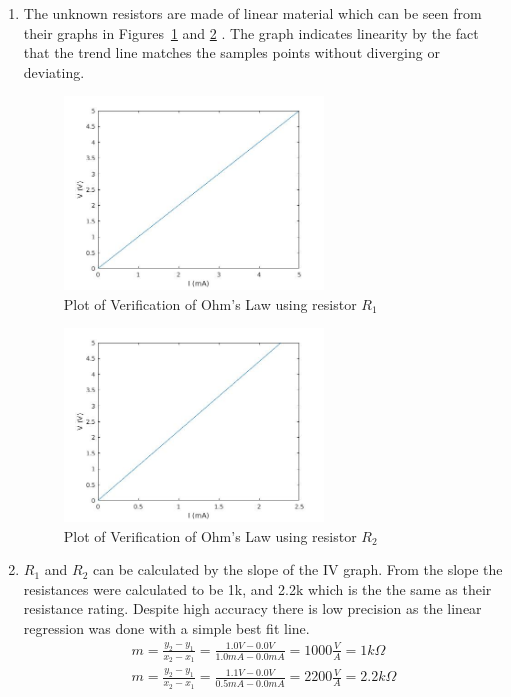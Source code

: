 \documentclass{article}
\begin{document}
\begin{enumerate}
  \item The unknown resistors are made of linear material which can be seen from their graphs in Figures~\ref{fig:plot1} and \ref{fig:plot2} .
  The graph indicates linearity by the fact that the trend line matches the
  samples points without diverging or deviating.
    \begin{figure}[!ht]
  \centering
  \caption{Plot of Verification of Ohm's Law using resistor $R_1$\label{fig:plot1}}
  \includegraphics[width=0.65\textwidth]{img/plot1.jpg}
  \end{figure}

    \begin{figure}[!ht]
  \centering
  \caption{Plot of Verification of Ohm's Law using resistor $R_2$\label{fig:plot2}}
  \includegraphics[width=0.65\textwidth]{img/plot2.jpg}
  \end{figure}

  \item $R_1$ and $R_2$ can be calculated by the slope of the IV graph.
  From the slope the resistances were calculated to be 1k, and 2.2k which is the
  the same as their resistance rating. Despite high accuracy there is low precision as
  the linear regression was done with a simple best fit line.
  \begin{gather}
    m = \frac{y_2-y_1}{x_2-x_1} = \frac{1.0 V - 0.0 V}{1.0 mA - 0.0 mA} = 1000 \frac{V}{A} = 1 k \Omega \\
    m = \frac{y_2-y_1}{x_2-x_1} = \frac{1.1 V - 0.0 V}{0.5 mA - 0.0 mA} = 2200 \frac{V}{A} = 2.2 k \Omega
  \end{gather}
\end{enumerate}
\end{document}
